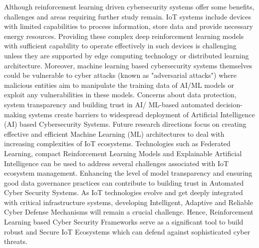\documentclass[12pt]{article}
\begin{document}
Although reinforcement learning driven cybersecurity systems offer some benefits, challenges and areas requiring further study remain. IoT systems include devices with limited capabilities to process information, store data and provide necessary energy resources. Providing these complex deep reinforcement learning models with sufficient capability to operate effectively in such devices is challenging unless they are supported by edge computing technology or distributed learning architecture. Moreover, machine learning based cybersecurity systems themselves could be vulnerable to cyber attacks (known as "adversarial attacks") where malicious entities aim to manipulate the training data of AI/ML models or exploit any vulnerabilities in these models. Concerns about data protection, system transparency and building trust in AI/ ML-based automated decision-making systems create barriers to widespread deployment of Artificial Intelligence (AI) based Cybersecurity Systems. 
Future research directions focus on creating effective and efficient Machine Learning (ML) architectures to deal with increasing complexities of IoT ecosystems. Technologies such as Federated Learning, compact Reinforcement Learning Models and Explainable Artificial Intelligence can be used to address several challenges associated with IoT ecosystem management. Enhancing the level of model transparency and ensuring good data governance practices can contribute to building trust in Automated Cyber Security Systems. As IoT technologies evolve and get deeply integrated with critical infrastructure systems, developing Intelligent, Adaptive and Reliable Cyber Defense Mechanisms will remain a crucial challenge. Hence, Reinforcement Learning based Cyber Security Frameworks serve as a significant tool to build robust and Secure IoT Ecosystems which can defend against sophisticated cyber threats.
	

	
	
	
\end{document}
